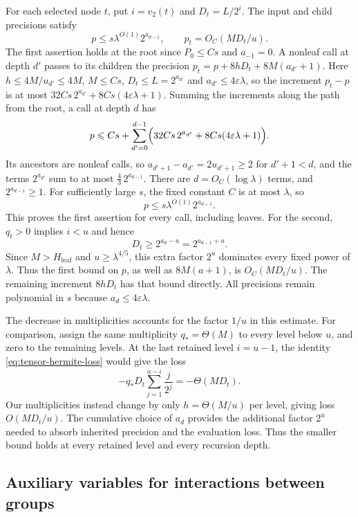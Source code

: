 For each selected node $t$, put $i=v_2(t)$ and $D_t=L/2^i$.
The input and child precisions satisfy
\begin{equation}\label{eq:tensor-precision-bound}
 p\le s\lambda^{O(1)}2^{a_{d-1}},
 \qquad
 p_t=O_C(MD_t/u).
\end{equation}
The first assertion holds at the root since $P_0\le Cs$ and
$a_{-1}=0$. A nonleaf call at depth $d'$ passes to its children the
precision $p_t=p+8hD_t+8M(a_{d'}+1)$. Here $h\le4M/u_{d'}\le4M$,
$M\le Cs$, $D_t\le L=2^{a_{d'}}$ and $a_{d'}\le4\varepsilon\lambda$,
so the increment $p_t-p$ is at most
$32Cs\,2^{a_{d'}}+8Cs(4\varepsilon\lambda+1)$. Summing the increments
along the path from the root, a call at depth $d$ has
\[
 p\le Cs+\sum_{d'=0}^{d-1}\Bigl(32Cs\,2^{a_{d'}}
        +8Cs(4\varepsilon\lambda+1)\Bigr).
\]
Its ancestors are nonleaf calls, so $a_{d'+1}-a_{d'}=2u_{d'+1}\ge2$ for
$d'+1<d$, and the terms $2^{a_{d'}}$ sum to at most
$\frac43\,2^{a_{d-1}}$. There are $d=O_C(\log\lambda)$ terms, and
$2^{a_{d-1}}\ge1$. For sufficiently large $s$, the fixed constant
$C$ is at most $\lambda$, so
\[
 p\le s\lambda^{O(1)}2^{a_{d-1}}.
\]
This proves the first assertion for every call, including leaves.
For the second, $q_t>0$ implies $i<u$ and hence
\[
 D_t\ge2^{a_d-u}=2^{a_{d-1}+u}.
\]
Since $M>H_{\mathrm{leaf}}$ and $u\ge\lambda^{4/5}$, this extra factor $2^u$
dominates every fixed power of $\lambda$.  Thus the first bound
on $p$, as well as $8M(a+1)$, is $O_C(MD_t/u)$.
The remaining increment $8hD_t$ has that bound directly.
All precisions remain polynomial in $s$ because
$a_d\le4\varepsilon\lambda$.

The decrease in multiplicities accounts for the factor $1/u$ in this estimate.
For comparison, assign the same multiplicity $q_*=\Theta(M)$ to
every level below $u$, and zero to the remaining levels.  At the
last retained level $i=u-1$, the identity
\eqref{eq:tensor-hermite-loss} would give the loss
\[
 -q_*D_t\sum_{j=1}^{a-i}\frac{j}{2^j}=-\Theta(MD_t).
\]
Our multiplicities instead change by only $h=\Theta(M/u)$ per
level, giving loss $O(MD_t/u)$.  The cumulative choice of $a_d$
provides the additional factor $2^u$ needed to absorb inherited
precision and the evaluation loss.  Thus the smaller bound holds
at every retained level and every recursion depth.

\subsection{Auxiliary variables for interactions between groups}
\label{subsec:tensor-auxiliary-variables}

